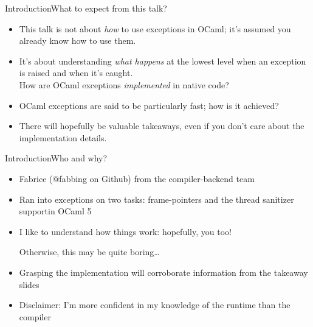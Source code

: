 \begin{frame}{Introduction}{What to expect from this talk?}
  \begin{itemize}
    \item This talk is not about \emph{how} to use exceptions in OCaml; it's assumed you already know how to use them.
    \item It's about understanding \emph{what happens} at the lowest level when an exception is raised and when it's caught.\\
      How are OCaml exceptions \emph{implemented} in native code?
    \item OCaml exceptions are said to be particularly fast; how is it achieved?
    \bigskip
    \item There will hopefully be valuable takeaways, even if you don't care about the implementation details.
  \end{itemize}
\end{frame}


\begin{frame}{Introduction}{Who and why?}
  \begin{itemize}
    \item Fabrice (@fabbing on Github) from the compiler-backend team
    \item Ran into exceptions on two tasks: frame-pointers and the thread sanitizer support\footnotemark[1] in OCaml 5
    \bigskip
    \item I like to understand how things work: hopefully, you too! \begin{tiny}Otherwise, this may be quite boring\dots\end{tiny}
    \item Grasping the implementation will corroborate information from the takeaway slides
    \bigskip
    \item Disclaimer: I'm more confident in my knowledge of the runtime than the compiler
  \end{itemize}
\end{frame}


